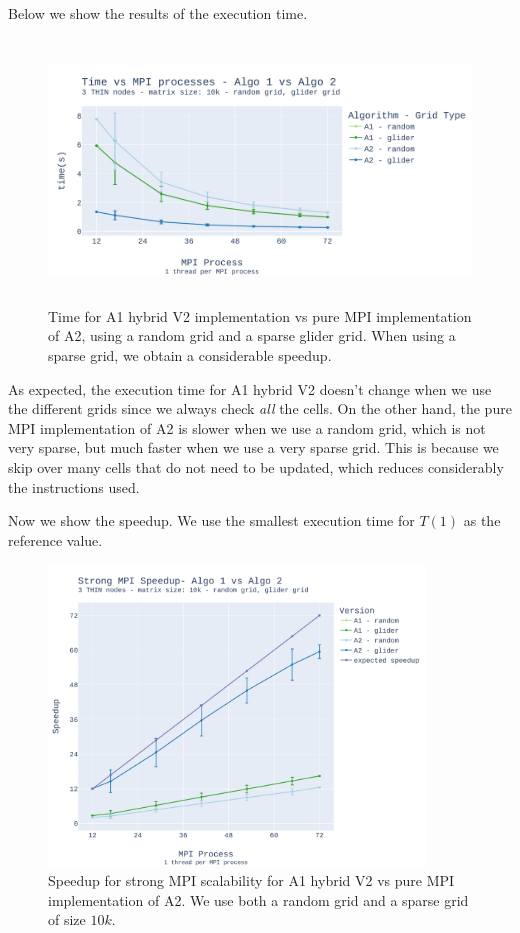 \documentclass{report}
\begin{document}
Below we show the results of the execution time.

\begin{figure}[H]
\centering
\includegraphics[width=14cm, height=7cm]{./images/a1_v_a2_static_grid_010k.pdf}
\caption{\label{fig:strongmpiepychybrid} Time for A1 hybrid V2 implementation 
vs pure MPI implementation of A2, using a random grid and a sparse glider grid. When 
using a sparse grid, we obtain a considerable speedup.}
\end{figure}

As expected, the execution time for A1 hybrid V2 doesn't change when we use the 
different grids since we always check \textit{all} the cells.
On the other hand, the pure MPI implementation of A2 is slower when we use a 
random grid, which is not very sparse, but much faster when we use a very sparse 
grid. This is because we skip over many cells that do not need to be updated, 
which reduces considerably the instructions used.

Now we show the speedup. We use the smallest execution time for $T(1)$ as the 
reference value.

\begin{figure}[H]
\centering
\includegraphics[width=10cm, height=8cm]{./images/a1_v_a2_static_grid_010k_speedup.pdf}
\caption{\label{fig:strongmpiepychybridspeedup} Speedup for strong MPI scalability 
for A1 hybrid V2 vs pure MPI implementation of A2. We use both a 
random grid and a sparse grid of size $10k$.}
\end{figure}
\end{document}

